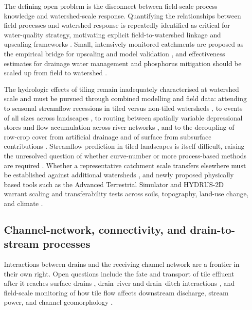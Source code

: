 \documentclass[11pt]{article}
\begin{document}
The defining open problem is the disconnect between field-scale process
knowledge and watershed-scale response. Quantifying the relationships between
field processes and watershed response is repeatedly identified as critical for
water-quality strategy, motivating explicit field-to-watershed linkage and
upscaling frameworks \parencite{Williams2015,Williams2017,Wang2020b}. Small,
intensively monitored catchments are proposed as the empirical bridge for
upscaling and model validation \parencite{Kyllmar2023,Basu2010}, and
effectiveness estimates for drainage water management and phosphorus mitigation
should be scaled up from field to watershed
\parencite{Wang2021,Ross2016,Shedekar2021}.

The hydrologic effects of tiling remain inadequately characterised at watershed
scale and must be pursued through combined modelling and field data: attending
to seasonal streamflow recessions in tiled versus non-tiled watersheds
\parencite{Schilling2008,Schilling2012}, to events of all sizes across
landscapes \parencite{Sloan2017}, to routing between spatially variable
depressional stores and flow accumulation across river networks
\parencite{Sloan2016,Fonley2021}, and to the decoupling of row-crop cover from
artificial drainage and of surface from subsurface contributions
\parencite{BolandBrien2014}. Streamflow prediction in tiled landscapes is
itself difficult, raising the unresolved question of whether curve-number or
more process-based methods are required
\parencite{Wessel2022,Thomas2016,Rahman2014}. Whether a representative
catchment scale transfers elsewhere must be established against additional
watersheds \parencite{Basu2010,Thomas2016}, and newly proposed physically based
tools such as the Advanced Terrestrial Simulator and HYDRUS-2D warrant scaling
and transferability tests across soils, topography, land-use change, and
climate \parencite{Rathore2025,Naderi2025,Basu2010}.

\subsection{Channel-network, connectivity, and drain-to-stream processes}

Interactions between drains and the receiving channel network are a frontier in
their own right. Open questions include the fate and transport of tile effluent
after it reaches surface drains \parencite{Clement2017}, drain--river and
drain--ditch interactions \parencite{Grangeon2021}, and field-scale monitoring
of how tile flow affects downstream discharge, stream power, and channel
geomorphology \parencite{Zhou2025,Zhou2013}.
\end{document}
